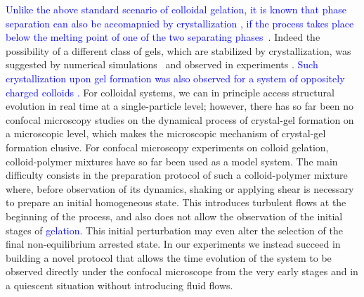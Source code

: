 \documentclass[preprint,amsmath,amssymb,superscriptaddress]{revtex4-1}
\begin{document}
\textcolor{blue}{Unlike the above standard scenario of colloidal gelation, it is known that phase separation can also be accomapnied by crystallization \cite{poon1999cpm,renth2001phase}, if the process takes place below the melting point of one of the two separating phases}~\cite{tanaka1985new}. Indeed the possibility of a different class of gels, which are stabilized by crystallization, 
was suggested by numerical simulations~\cite{soga1999metastable,fortini2008crystallization,perez2011pathways} and observed in experiments \cite{sabin2012,zhang2012non}. \textcolor{blue}{Such crystallization upon gel formation was also observed 
for a system of oppositely charged colloids \cite{sanz2008gel,sanz2008out}.}  
For colloidal systems, we can in principle access structural evolution in real time at a single-particle level; however, there has so far been no confocal microscopy  
studies on the dynamical process of crystal-gel formation on a microscopic level, which makes the microscopic mechanism of crystal-gel formation elusive. 
For confocal microscopy experiments on colloid gelation, colloid-polymer mixtures have so far been used as a model system. 
The main difficulty consists in the preparation protocol of such a colloid-polymer mixture where, before observation of its dynamics, shaking or applying shear is necessary to prepare an initial homogeneous state. This introduces turbulent flows at the beginning of the process, and also does not allow the
observation of the initial stages of  \textcolor{blue}{gelation}. This initial perturbation may even alter the selection of the final non-equilibrium arrested state.  
In our experiments we instead succeed in building a novel protocol that allows the time evolution of the system to be observed directly
under the confocal microscope from the very early stages and in a quiescent situation without introducing fluid flows. 
\end{document}
